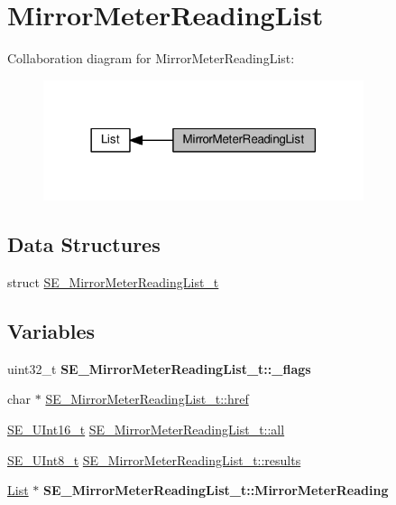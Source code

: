\hypertarget{group__MirrorMeterReadingList}{}\section{Mirror\+Meter\+Reading\+List}
\label{group__MirrorMeterReadingList}
Collaboration diagram for Mirror\+Meter\+Reading\+List\+:\nopagebreak
\begin{figure}[H]
\begin{center}
\leavevmode
\includegraphics[width=266pt]{group__MirrorMeterReadingList}
\end{center}
\end{figure}
\subsection*{Data Structures}
\begin{DoxyCompactItemize}
\item 
struct \hyperlink{structSE__MirrorMeterReadingList__t}{S\+E\+\_\+\+Mirror\+Meter\+Reading\+List\+\_\+t}
\end{DoxyCompactItemize}
\subsection*{Variables}
\begin{DoxyCompactItemize}
\item 
\mbox{\label{group__MirrorMeterReadingList_gadeb2c3e9c6570a2dd96d4919683954e6}} 
uint32\+\_\+t {\bfseries S\+E\+\_\+\+Mirror\+Meter\+Reading\+List\+\_\+t\+::\+\_\+flags}
\item 
char $\ast$ \hyperlink{group__MirrorMeterReadingList_gaefefadeff8d43344a34648716b272105}{S\+E\+\_\+\+Mirror\+Meter\+Reading\+List\+\_\+t\+::href}
\item 
\hyperlink{group__UInt16_gac68d541f189538bfd30cfaa712d20d29}{S\+E\+\_\+\+U\+Int16\+\_\+t} \hyperlink{group__MirrorMeterReadingList_ga2dcd78e43b71829805f181a0749ea9ab}{S\+E\+\_\+\+Mirror\+Meter\+Reading\+List\+\_\+t\+::all}
\item 
\hyperlink{group__UInt8_gaf7c365a1acfe204e3a67c16ed44572f5}{S\+E\+\_\+\+U\+Int8\+\_\+t} \hyperlink{group__MirrorMeterReadingList_ga06c065033d62755a9f1ab755638771f6}{S\+E\+\_\+\+Mirror\+Meter\+Reading\+List\+\_\+t\+::results}
\item 
\mbox{\label{group__MirrorMeterReadingList_gaac88d3e253648fab6a0dbf5dc6122a69}} 
\hyperlink{structList}{List} $\ast$ {\bfseries S\+E\+\_\+\+Mirror\+Meter\+Reading\+List\+\_\+t\+::\+Mirror\+Meter\+Reading}
\end{DoxyCompactItemize}


